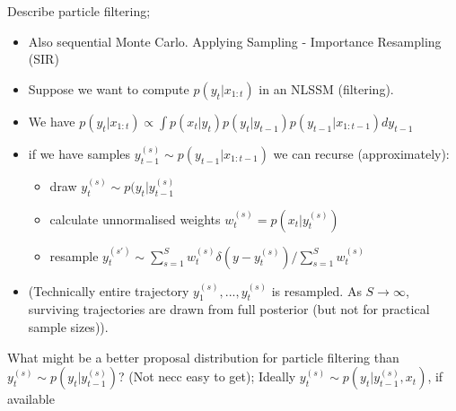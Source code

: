 \documentclass{article}
\begin{document}
Describe particle filtering; \begin{itemize}
    \item Also sequential Monte Carlo. Applying Sampling - Importance Resampling (SIR)
    \item Suppose we want to compute $p(y_t | x_{1:t})$ in an NLSSM (filtering). \item We have $p(y_t|x_{1:t}) \propto \int p(x_t|y_t)p(y_t|y_{t-1})p(y_{t-1}|x_{1:t-1})dy_{t-1}$
    \item if we have samples $y_{t-1}^{(s)}\sim p(y_{t-1}|x_{1:t-1})$ we can recurse (approximately): \begin{itemize}
        \item draw $y_t^{(s)} \sim p(y_t|y_{t-1}^{(s)}$
        \item calculate unnormalised weights $w_t^{(s)}=p(x_t|y_t^{(s)})$
        \item resample $y_t^{(s')} \sim \sum_{s=1}^S w_t^{(s)}\delta (y-y_t^{(s)})/\sum_{s=1}^Sw_t^{(s)}$
    \end{itemize}
    \item (Technically entire trajectory $y_1^{(s)}, ..., y_t^{(s)}$ is resampled. As $S\to\infty$, surviving trajectories are drawn from full posterior (but not for practical sample sizes)).
\end{itemize}

What might be a better proposal distribution for particle filtering than $y^{(s)}_t \sim p(y_t|y^{(s)}_{t-1})$? (Not necc easy to get); Ideally $y^{(s)}_t \sim p(y_t|y^{(s)}_{t-1}, x_t)$, if available
\end{document}
